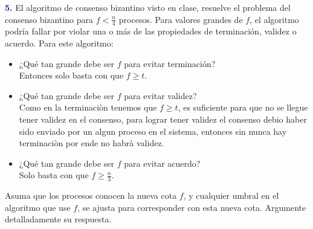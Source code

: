 \textbf{\textcolor{MidnightBlue}{5.}} El algoritmo de consenso bizantino visto en clase, resuelve el
problema del consenso bizantino para $f < \frac{n}{4}$ procesos. Para valores grandes de $f$, el
algoritmo podría fallar por violar una o más de las propiedades de terminación, validez o acuerdo.
Para este algoritmo:
\begin{itemize}
    \item ¿Qué tan grande debe ser $f$ para evitar terminación?\\
Entonces solo basta con que $f\geq t$.
    \item ¿Qué tan grande debe ser $f$ para evitar validez?\\
Como en la terminaciòn tenemos que $f\geq t$, es suficiente para que no se llegue tener validez en el consenso, para lograr tener validez el consenso debio haber sido enviado por un algun proceso en el sistema, entonces sin nunca hay terminaciòn por ende no habrà validez.
    \item ¿Qué tan grande debe ser $f$ para evitar acuerdo?\\
Solo basta con que $f\geq \frac{n}{3}$.
\end{itemize}
Asuma que los procesos conocen la nueva cota $f$, y cualquier umbral en el algoritmo que use $f$,
se ajusta para corresponder con esta nueva cota. Argumente detalladamente su respuesta.
